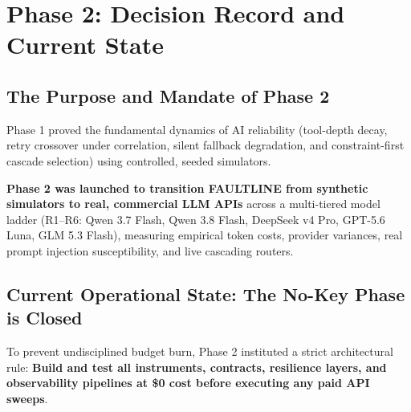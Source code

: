 \section{Phase 2: Decision Record and Current State}

\subsection{The Purpose and Mandate of Phase 2}
Phase 1 proved the fundamental dynamics of AI reliability (tool-depth decay, retry crossover under correlation, silent fallback degradation, and constraint-first cascade selection) using controlled, seeded simulators. 

\textbf{Phase 2 was launched to transition FAULTLINE from synthetic simulators to real, commercial LLM APIs} across a multi-tiered model ladder (R1--R6: Qwen 3.7 Flash, Qwen 3.8 Flash, DeepSeek v4 Pro, GPT-5.6 Luna, GLM 5.3 Flash), measuring empirical token costs, provider variances, real prompt injection susceptibility, and live cascading routers.

\subsection{Current Operational State: The No-Key Phase is Closed}
To prevent undisciplined budget burn, Phase 2 instituted a strict architectural rule: \textbf{Build and test all instruments, contracts, resilience layers, and observability pipelines at \$0 cost before executing any paid API sweeps}.


